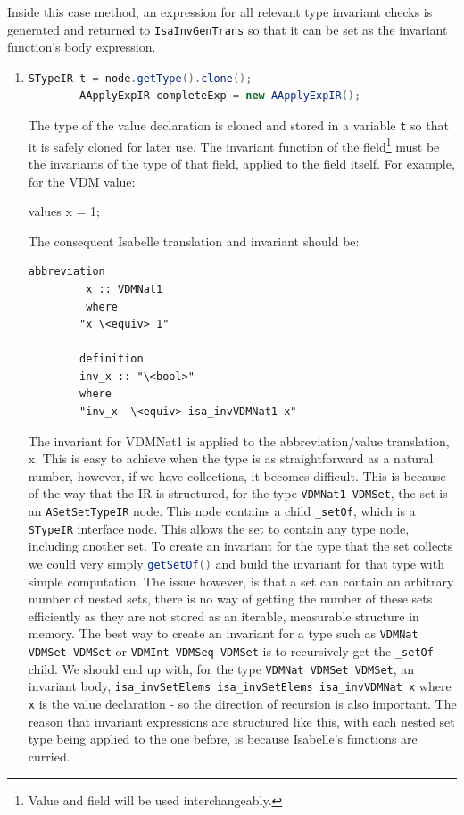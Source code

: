 	Inside this case method, an expression for all relevant type invariant checks is generated and returned to \lstinline[language=Java]{IsaInvGenTrans} so that it can be set as the invariant function's body expression. 
	\begin{enumerate}
		\item \begin{lstlisting}[language=Java]
		STypeIR t = node.getType().clone();
        AApplyExpIR completeExp = new AApplyExpIR();
		\end{lstlisting}
		The type of the value declaration is cloned and stored in a variable \lstinline[language=Java]{t} so that it is safely cloned for later use. The invariant function of the field\footnote{Value and field will be used interchangeably.} must be the invariants of the type of that field, applied to the field itself. For example, for the VDM value:
		\begin{vdmsl}
		values
		x = 1;
		\end{vdmsl}
		The consequent Isabelle translation and invariant should be:
		\begin{lstlisting}[language=Isabelle, mathescape]
		abbreviation
		 x :: VDMNat1
		 where
		"x \<equiv> 1"

		definition
		inv_x :: "\<bool>"
	    where
	    "inv_x  \<equiv> isa_invVDMNat1 x"
		\end{lstlisting}
		The invariant for VDMNat1 is applied to the abbreviation/value translation, x. This is easy to achieve when the type is as straightforward as a natural number, however, if we have collections, it becomes difficult. This is because of the way that the IR is structured, for the type \lstinline[language=Java]{VDMNat1 VDMSet}, the set is an \lstinline[language=Java]{ASetSetTypeIR} node. This node contains a child \lstinline[language=Java]{_setOf}, which is a \lstinline[language=Java]{STypeIR} interface node. This allows the set to contain any type node, including another set. To create an invariant for the type that the set collects we could very simply \lstinline[language=Java]{getSetOf()} and build the invariant for that type with simple computation. The issue however, is that a set can contain an arbitrary number of nested sets, there is no way of getting the number of these sets efficiently as they are not stored as an iterable, measurable structure in memory. The best way to create an invariant for a type such as \lstinline[language=Java]{VDMNat VDMSet VDMSet} or \lstinline[language=Java]{VDMInt VDMSeq VDMSet} is to recursively get the \lstinline[language=Java]{_setOf} child. We should end up with, for the type \lstinline[language=Java]{VDMNat VDMSet VDMSet}, an invariant body, \lstinline[language=Java]{isa_invSetElems isa_invSetElems isa_invVDMNat x} where \lstinline[language=Java]{x} is the value declaration - so the direction of recursion is also important. The reason that invariant expressions are structured like this, with each nested set type being applied to the one before, is because Isabelle's functions are curried.


\end{enumerate}
